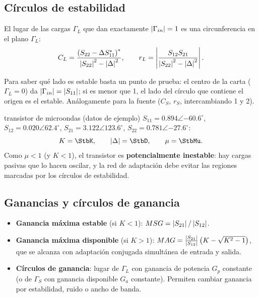 \subsection{Círculos de estabilidad}
El lugar de las cargas $\Gamma_L$ que dan exactamente $\left|\Gamma_{in}\right| = 1$ es una circunferencia en el plano $\Gamma_L$:
\begin{equation}
  C_L = \frac{\left(S_{22} - \Delta S_{11}^{*}\right)^{*}}{\left|S_{22}\right|^2 - \left|\Delta\right|^2}, \qquad
  r_L = \left|\frac{S_{12}S_{21}}{\left|S_{22}\right|^2 - \left|\Delta\right|^2}\right| .
\end{equation}
\begin{donde}
\end{donde}
Para saber qué lado es estable basta un punto de prueba: el centro de la carta ($\Gamma_L = 0$) da $\left|\Gamma_{in}\right| = \left|S_{11}\right|$; si es
menor que 1, el lado del círculo que contiene el origen es el estable. Análogamente para la fuente ($C_S$, $r_S$, intercambiando 1 y 2).

\begin{ejemplo}{transistor de microondas (datos de ejemplo)}
$S_{11} = 0.894\angle{-60.6^\circ}$, $S_{12} = 0.020\angle 62.4^\circ$, $S_{21} = 3.122\angle 123.6^\circ$, $S_{22} = 0.781\angle{-27.6^\circ}$:
\[
  K = \StbK, \qquad \abs\Delta = \StbD, \qquad \mu = \StbMu .
\]
Como $\mu < 1$ (y $K<1$), el transistor es \textbf{potencialmente inestable}: hay cargas pasivas que lo hacen oscilar, y la red de
adaptación debe evitar las regiones marcadas por los círculos de estabilidad.
\end{ejemplo}

\subsection{Ganancias y círculos de ganancia}
\begin{itemize}
\item \textbf{Ganancia máxima estable} (si $K<1$): $MSG = \left|S_{21}\right|/\left|S_{12}\right|$.
\item \textbf{Ganancia máxima disponible} (si $K>1$): $MAG = \frac{\left|S_{21}\right|}{\left|S_{12}\right|}\left(K - \sqrt{K^2 - 1}\right)$, que se alcanza con
adaptación conjugada simultánea de entrada y salida.
\item \textbf{Círculos de ganancia}: lugar de $\Gamma_L$ con ganancia de potencia $G_p$ constante (o de $\Gamma_S$ con ganancia disponible $G_a$
constante). Permiten cambiar ganancia por estabilidad, ruido o ancho de banda.
\end{itemize}

